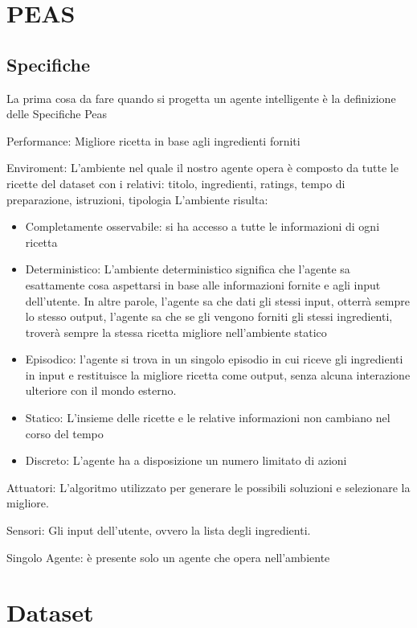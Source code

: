 \documentclass[12pt]{report}
\begin{document}
\chapter{PEAS}
\section{Specifiche}
La prima cosa da fare quando si progetta un agente intelligente è la definizione delle Specifiche Peas

Performance: Migliore ricetta in base agli ingredienti forniti

Enviroment: L’ambiente nel quale il nostro agente opera è composto da tutte le ricette del dataset con i relativi: titolo, ingredienti, ratings, tempo di preparazione, istruzioni, tipologia
L’ambiente risulta:
\begin{itemize}
\item Completamente osservabile: si ha accesso a tutte le informazioni di ogni ricetta
\item Deterministico: L'ambiente deterministico significa che l'agente sa esattamente cosa aspettarsi in base alle informazioni fornite e agli input dell'utente. In altre parole, l'agente sa che dati gli stessi input, otterrà sempre lo stesso output, l'agente sa che se gli vengono forniti gli stessi ingredienti, troverà sempre la stessa ricetta migliore nell'ambiente statico
\item Episodico: l'agente si trova in un singolo episodio in cui riceve gli ingredienti in input e restituisce la migliore ricetta come output, senza alcuna interazione ulteriore con il mondo esterno.
\item Statico: L’insieme delle ricette e le relative informazioni non cambiano nel corso del tempo
\item Discreto: L’agente ha a disposizione un numero limitato di azioni
 \end{itemize}

Attuatori: L'algoritmo utilizzato per generare le possibili soluzioni e selezionare la migliore. 

Sensori: Gli input dell'utente, ovvero la lista degli ingredienti.

Singolo Agente: è presente solo un agente che opera nell’ambiente

\chapter{Dataset}
\end{document}
